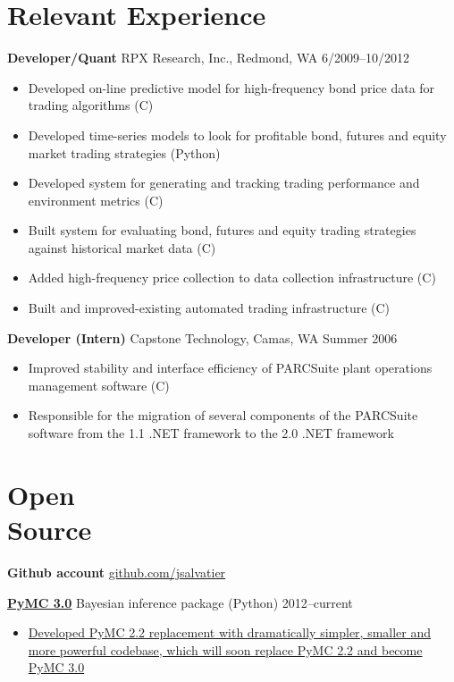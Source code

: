\documentclass[margin]{res}
\newcommand{\bitem}{\begin{itemize} \itemsep -2pt}
\newcommand{\hrowbase}[3]{
  {\bf #1} #2 \hfill #3
}
\newcommand{\headrow}[3]{
  \hrowbase{#1}{#2}{#3}
    \vspace{6pt}
    \bitem
      }
\newcommand{\eheadrow}[0]{\end{itemize}}
\newcommand{\CS}
{C\nolinebreak[4]\hspace{-.05em}\raisebox{.22ex}{\footnotesize\#}}
\begin{document}
 

\resumewidth=6.5in
\newsectionwidth{1.0in}
\begin{resume} 
 

\section{Relevant Experience}
  \headrow{Developer/Quant}{RPX Research, Inc., Redmond, WA}{6/2009--10/2012}
     \item Developed on-line predictive model for high-frequency bond price data for trading algorithms (\CS)
     \item Developed time-series models to look for profitable bond, futures and equity market trading strategies (Python) 
     \item Developed system for generating and tracking trading performance and environment metrics (\CS)
     \item Built system for evaluating bond, futures and equity trading strategies against historical market data (\CS) 
     \item Added high-frequency price collection to data collection infrastructure (\CS)
     \item Built and improved-existing automated trading infrastructure (\CS)
  \eheadrow

  \headrow{Developer (Intern)}{Capstone Technology, Camas, WA}{Summer 2006}
    \item Improved stability and interface efficiency of PARCSuite plant operations management software (\CS)
    \item Responsible for the migration of several components of the PARCSuite software from the 1.1 .NET framework to the 2.0 .NET framework 
  \eheadrow

 \section{Open \\
          Source}
 {\bf Github account} \href{https://github.com/jsalvatier}{github.com/jsalvatier}

    \headrow{\href{https://github.com/pymc-devs/pymc/commits/pymc3\#readme}{PyMC 3.0}}{Bayesian inference package (Python)}{2012--current}
      \item \href{https://github.com/pymc-devs/pymc/commits/pymc3}{Developed PyMC 2.2 replacement with dramatically simpler, smaller and more powerful codebase, which will soon replace PyMC 2.2 and become PyMC 3.0}
    \eheadrow


\end{resume}
\end{document}
